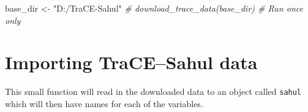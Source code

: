 \documentclass[
]{article}
\newenvironment{Shaded}{\begin{snugshade}}{\end{snugshade}}
\newcommand{\CommentTok}[1]{\textcolor[rgb]{0.56,0.35,0.01}{\textit{#1}}}
\newcommand{\NormalTok}[1]{#1}
\newcommand{\OtherTok}[1]{\textcolor[rgb]{0.56,0.35,0.01}{#1}}
\newcommand{\StringTok}[1]{\textcolor[rgb]{0.31,0.60,0.02}{#1}}
\begin{document}
\begin{Shaded}
\begin{Highlighting}[]
\NormalTok{base\_dir }\OtherTok{\textless{}{-}} \StringTok{"D:/TraCE{-}Sahul"}
\CommentTok{\# download\_trace\_data(base\_dir) \# Run once only}
\end{Highlighting}
\end{Shaded}

\section{Importing TraCE--Sahul data}\label{importing-tracesahul-data}

This small function will read in the downloaded data to an object called
\texttt{sahul} which will then have names for each of the variables.
\end{document}
